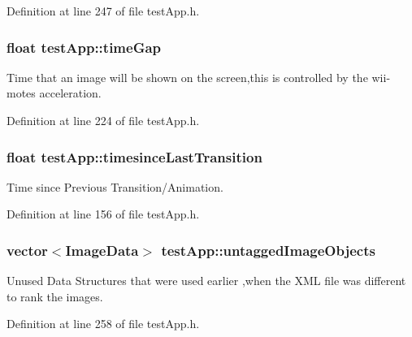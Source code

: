 Definition at line 247 of file test\-App.\-h.

\hypertarget{classtest_app_a944f2713019239a4b49241a5cc9a00c9}{
\subsubsection[{time\-Gap}]{\setlength{\rightskip}{0pt plus 5cm}float test\-App\-::time\-Gap}}\label{classtest_app_a944f2713019239a4b49241a5cc9a00c9}


Time that an image will be shown on the screen,this is controlled by the wii-\/motes acceleration. 



Definition at line 224 of file test\-App.\-h.

\hypertarget{classtest_app_acb60fb8a89e9ec5d461630a20b11ceda}{
\subsubsection[{timesince\-Last\-Transition}]{\setlength{\rightskip}{0pt plus 5cm}float test\-App\-::timesince\-Last\-Transition}}\label{classtest_app_acb60fb8a89e9ec5d461630a20b11ceda}


Time since Previous Transition/\-Animation. 



Definition at line 156 of file test\-App.\-h.

\hypertarget{classtest_app_ae31cc868f554f62b4c6e4e9db3b4155b}{
\subsubsection[{untagged\-Image\-Objects}]{\setlength{\rightskip}{0pt plus 5cm}vector$<${\bf Image\-Data}$>$ test\-App\-::untagged\-Image\-Objects}}\label{classtest_app_ae31cc868f554f62b4c6e4e9db3b4155b}


Unused Data Structures that were used earlier ,when the X\-M\-L file was different to rank the images. 



Definition at line 258 of file test\-App.\-h.

